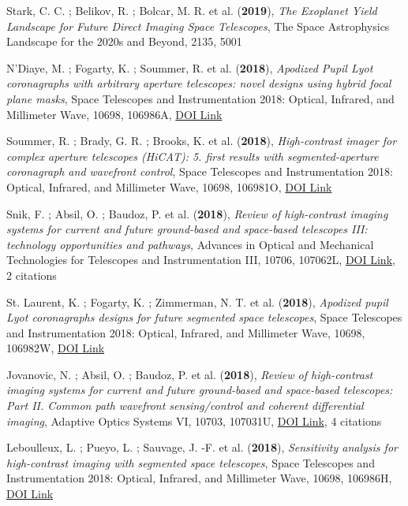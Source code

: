 \documentclass[11pt]{article}
\begin{document}
\begin{etaremune} \itemsep 0pt

\item Stark, C. C. ; Belikov, R. ; Bolcar, M. R. et al. ({\bf2019}), {\it The Exoplanet Yield Landscape for Future Direct Imaging Space Telescopes}, The Space Astrophysics Landscape for the 2020s and Beyond, 2135, 5001

 \item N'Diaye, M. ; Fogarty, K. ; Soummer, R. et al. ({\bf2018}), {\it Apodized Pupil Lyot coronagraphs with arbitrary aperture telescopes: novel designs using hybrid focal plane masks}, Space Telescopes and Instrumentation 2018: Optical, Infrared, and Millimeter Wave, 10698, 106986A, \href{https://doi.org/10.1117/12.2313225}{DOI Link}

 \item Soummer, R. ; Brady, G. R. ; Brooks, K. et al. ({\bf2018}), {\it High-contrast imager for complex aperture telescopes (HiCAT): 5. first results with segmented-aperture coronagraph and wavefront control}, Space Telescopes and Instrumentation 2018: Optical, Infrared, and Millimeter Wave, 10698, 106981O, \href{https://doi.org/10.1117/12.2314110}{DOI Link}

 \item Snik, F. ; Absil, O. ; Baudoz, P. et al. ({\bf2018}), {\it Review of high-contrast imaging systems for current and future ground-based and space-based telescopes III: technology opportunities and pathways}, Advances in Optical and Mechanical Technologies for Telescopes and Instrumentation III, 10706, 107062L, \href{https://doi.org/10.1117/12.2313957}{DOI Link}, 2 citations

 \item St. Laurent, K. ; Fogarty, K. ; Zimmerman, N. T. et al. ({\bf2018}), {\it Apodized pupil Lyot coronagraphs designs for future segmented space telescopes}, Space Telescopes and Instrumentation 2018: Optical, Infrared, and Millimeter Wave, 10698, 106982W, \href{https://doi.org/10.1117/12.2313902}{DOI Link}

 \item Jovanovic, N. ; Absil, O. ; Baudoz, P. et al. ({\bf2018}), {\it Review of high-contrast imaging systems for current and future ground-based and space-based telescopes: Part II. Common path wavefront sensing/control and coherent differential imaging}, Adaptive Optics Systems VI, 10703, 107031U, \href{https://doi.org/10.1117/12.2314260}{DOI Link}, 4 citations

 \item Leboulleux, L. ; Pueyo, L. ; Sauvage, J. -F. et al. ({\bf2018}), {\it Sensitivity analysis for high-contrast imaging with segmented space telescopes}, Space Telescopes and Instrumentation 2018: Optical, Infrared, and Millimeter Wave, 10698, 106986H, \href{https://doi.org/10.1117/12.2313904}{DOI Link}


\end{etaremune}
\end{document}
